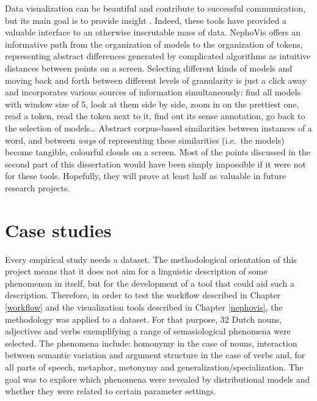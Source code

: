 \documentclass[
]{book}
\begin{document}
Data visualization can be beautiful and contribute to successful communication, but its main goal is to provide insight \autocite{card.etal_1999}. Indeed, these tools have provided a valuable interface to an otherwise inscrutable mass of data.
NephoVis offers an informative path from the organization of models to the organization of tokens, representing abstract differences generated by complicated algorithms as intuitive distances between points on a screen. Selecting different kinds of models and moving back and forth between different levels of granularity is just a click away and incorporates various sources of information simultaneously: find all models with window size of 5, look at them side by side, zoom in on the prettiest one, read a token, read the token next to it, find out its sense annotation, go back to the selection of models\ldots{} Abstract corpus-based similarities between instances of a word, and between \emph{ways} of representing these similarities (i.e.~the models) become tangible, colourful clouds on a screen.
Most of the points discussed in the second part of this dissertation would have been simply impossible if it were not for these tools. Hopefully, they will prove at least half as valuable in future research projects.

\hypertarget{dataset}{%
\chapter{Case studies}\label{dataset}}

Every empirical study needs a dataset. The methodological orientation of this project means that it does not aim for a linguistic description of some phenomenon in itself, but for the development of a tool that could aid such a description. Therefore, in order to test the workflow described in Chapter \ref{workflow} and the visualization tools described in Chapter \ref{nephovis}, the methodology was applied to a dataset. For that purpose, 32 Dutch nouns, adjectives and verbs exemplifying a range of semasiological phenomena were selected. The phenomena include: homonymy in the case of nouns, interaction between semantic variation and argument structure in the case of verbs and, for all parts of speech, metaphor, metonymy and generalization/specialization. The goal was to explore which phenomena were revealed by distributional models and whether they were related to certain parameter settings.
\end{document}

